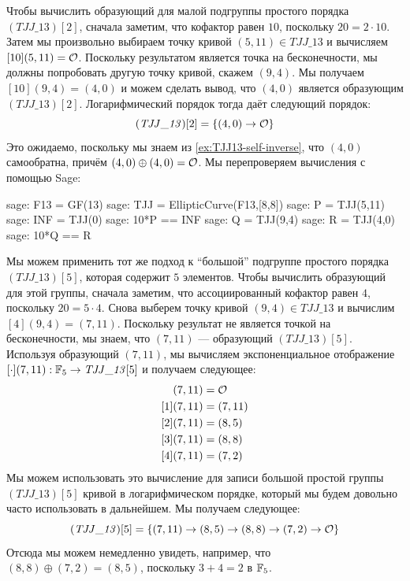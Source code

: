 \begin{example}
Чтобы вычислить образующий для малой подгруппы простого порядка $(\mathit{TJJ\_13})[2]$, сначала заметим, что кофактор равен $10$, поскольку $20=2\cdot 10$. Затем мы произвольно выбираем точку кривой $(5,11)\in \mathit{TJJ\_13}$ и вычисляем $[10](5,11)=\mathcal{O}$. Поскольку результатом является точка на бесконечности, мы должны попробовать другую точку кривой, скажем $(9,4)$. Мы получаем $[10](9,4)=(4,0)$ и можем сделать вывод, что $(4,0)$ является образующим $(\mathit{TJJ\_13})[2]$. Логарифмический порядок тогда даёт следующий порядок:
\begin{equation}
(\mathit{TJJ\_13})[2] = \{(4,0)\to \mathcal{O}\}
\end{equation}
Это ожидаемо, поскольку мы знаем из \examplename{} \ref{ex:TJJ13-self-inverse}, что $(4,0)$ самообратна, причём $(4,0)\oplus (4,0)=\mathcal{O}$. Мы перепроверяем вычисления с помощью Sage: 
\begin{sagecommandline}
sage: F13 = GF(13)
sage: TJJ = EllipticCurve(F13,[8,8])
sage: P = TJJ(5,11)
sage: INF = TJJ(0)
sage: 10*P == INF
sage: Q = TJJ(9,4)
sage: R = TJJ(4,0)
sage: 10*Q == R
\end{sagecommandline}
Мы можем применить тот же подход к ``большой'' подгруппе простого порядка $(\mathit{TJJ\_13})[5]$, которая содержит $5$ элементов. Чтобы вычислить образующий для этой группы, сначала заметим, что ассоциированный кофактор равен $4$, поскольку $20=5\cdot 4$. Снова выберем точку кривой $(9,4)\in \mathit{TJJ\_13}$ и вычислим $[4](9,4)=(7,11)$. Поскольку результат не является точкой на бесконечности, мы знаем, что $(7,11)$ — образующий $(\mathit{TJJ\_13})[5]$. Используя образующий $(7,11)$, мы вычисляем экспоненциальное отображение $[\cdot](7,11): \mathbb{F}_5 \to \mathit{TJJ\_13}[5]$ и получаем следующее:
\begin{align*}
[0](7,11) &= \Oinf\\
[1](7,11) &= (7,11)\\
[2](7,11) &= (8,5)\\
[3](7,11) &= (8,8)\\
[4](7,11) &= (7,2)
\end{align*}
Мы можем использовать это вычисление для записи большой простой группы $(\mathit{TJJ\_13})[5]$ кривой  в логарифмическом порядке, который мы будем довольно часто использовать в дальнейшем. Мы получаем следующее:
\begin{equation}\label{eq:TJJ13-logarithmic-order}
(\mathit{TJJ\_13})[5] = \{(7,11)\to(8,5)\to(8,8)\to(7,2)\to \mathcal{O}\}
\end{equation}
Отсюда мы можем немедленно увидеть, например, что $(8,8)\oplus (7,2)= (8,5)$, поскольку $3+4=2$ в $\mathbb{F}_5$.
\end{example}
